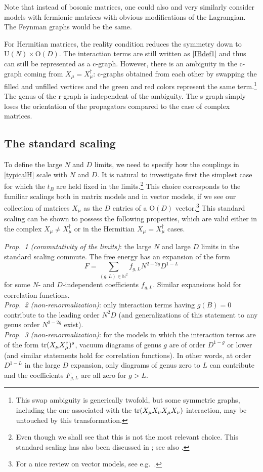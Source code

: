 \documentclass[12pt]{article}
\numberwithin{equation}{section}
\def\be{\begin{equation}}\def\ee{\end{equation}}
\begin{document}
Note that instead of bosonic matrices, one could also and very similarly consider models with fermionic matrices with obvious modifications of the Lagrangian. The Feynman graphs would be the same. 

For Hermitian matrices, the reality condition reduces the symmetry down to $\text{U}(N)\times\text{O}(D)$. The interaction terms are still written as \eqref{IBdef1} and thus can still be represented as a c-graph. However, there is an ambiguity in the c-graph coming from $X_{\mu}=X_{\mu}^{\dagger}$: c-graphs obtained from each other by swapping the filled and unfilled vertices and the green and red colors represent the same term.\footnote{This swap ambiguity is generically twofold, but some symmetric graphs, including the one associated with the $\mathop{\rm tr}\nolimits (X_{\mu}X_{\nu}X_{\mu}X_{\nu})$ interaction, may be untouched by this transformation.} The genus of the r-graph is independent of the ambiguity. The s-graph simply loses the orientation of the propagators compared to the case of complex matrices.

%
\subsection{\label{StandardScalingResSec} The standard scaling}
%

To define the large $N$ and $D$ limits, we need to specify how the couplings in \eqref{typicalH} scale with $N$ and $D$. It is natural to investigate first the simplest case for which the $t_{B}$ are held fixed in the limits.\footnote{Even though we shall see that this is not the most relevant choice. This standard scaling has also been discussed in \cite{japanese}; see also \cite{italians}.} This choice corresponds to the familiar scalings both in matrix models and in vector models, if we see our collection of matrices $X_{\mu}$ as the $D$ entries of a $\text{O}(D)$ vector.\footnote{For a nice review on vector models, see e.g.\ \cite{vectorrev}.} This standard scaling can be shown to possess the following properties, which are valid either in the complex $X_{\mu}\not = X_{\mu}^{\dagger}$ or in the Hermitian $X_{\mu}=X_{\mu}^{\dagger}$ cases.

\noindent\emph{Prop.\ 1 (commutativity of the limits)}: the large $N$ and large $D$ limits in the standard scaling commute. The free energy has an expansion of the form
%
\be\label{Fexp1} F=\sum_{(g,L)\in\mathbb N^{2}}f_{g,L}N^{2-2g}D^{1-L}\ee
%
for some $N$- and $D$-independent coefficients $f_{g,L}$. Similar expansions hold for correlation functions.\smallskip\\
\noindent\emph{Prop.\ 2 (non-renormalization)}: only interaction terms having $g(B)=0$ contribute to the leading order $N^{2}D$ (and generalizations of this statement to any genus order $N^{2-2g}$ exist).\smallskip\\
\noindent\emph{Prop.\ 3 (non-renormalization)}: for the models in which the interaction terms are of the form $\mathop{\rm tr}\nolimits (X_{\mu}X_{\mu}^{\dagger})^{s}$, vacuum diagrams of genus $g$ are of order $D^{1-g}$ or lower (and similar statements hold for correlation functions). In other words, at order $D^{1-L}$ in the large $D$ expansion, only diagrams of genus zero to $L$ can contribute and the coefficients $F_{g,L}$ are all zero for $g>L$.
\end{document}
